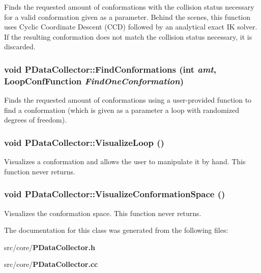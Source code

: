 Finds the requested amount of conformations with the collision status necessary for a valid conformation given as a parameter. Behind the scenes, this function uses Cyclic Coordinate Descent (CCD) followed by an analytical exact IK solver. If the resulting conformation does not match the collision status necessary, it is discarded. 
\subsubsection{\setlength{\rightskip}{0pt plus 5cm}void PData\-Collector::Find\-Conformations (int {\em amt}, {\bf Loop\-Conf\-Function} {\em Find\-One\-Conformation})}\label{classPDataCollector_d95e26764a2a59dcb7d39fdeb5e74b3c}


Finds the requested amount of conformations using a user-provided function to find a conformation (which is given as a parameter a loop with randomized degrees of freedom). 
\subsubsection{\setlength{\rightskip}{0pt plus 5cm}void PData\-Collector::Visualize\-Loop ()}\label{classPDataCollector_16b82d63b9f0e816ef33eacff84574c7}


Visualizes a conformation and allows the user to manipulate it by hand. This function never returns. 
\subsubsection{\setlength{\rightskip}{0pt plus 5cm}void PData\-Collector::Visualize\-Conformation\-Space ()}\label{classPDataCollector_8bff4435911c82807174a00cb7c26809}


Visualizes the conformation space. This function never returns. 

The documentation for this class was generated from the following files:\begin{CompactItemize}
\item 
src/core/{\bf PData\-Collector.h}\item 
src/core/{\bf PData\-Collector.cc}\end{CompactItemize}
